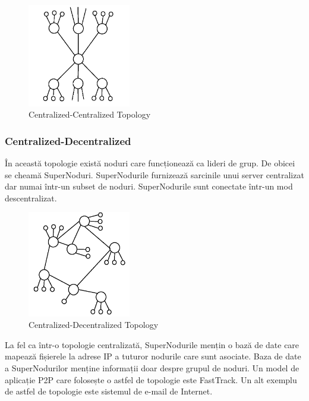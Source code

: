 \begin{figure}
  \centering
  \includegraphics[width=0.4\textwidth]{src/img/p2p-systems/centralized-centralized}
  \caption{Centralized-Centralized Topology}
  \label{fig:p2p-systems:centralized-centralized}
\end{figure}

\subsubsection{Centralized-Decentralized}

În această topologie există noduri care funcționează ca lideri de grup. De
obicei se cheamă SuperNoduri. SuperNodurile furnizează sarcinile unui server
centralizat dar numai într-un subset de noduri. SuperNodurile sunt conectate
într-un mod descentralizat.

\begin{figure}
  \centering
  \includegraphics[width=0.4\textwidth]{src/img/p2p-systems/centralized-decentralized}
  \caption{Centralized-Decentralized Topology}
  \label{fig:p2p-systems:centralized-decentralized}
\end{figure}

La fel ca într-o topologie centralizată, SuperNodurile mențin o bază de date
care mapează fișierele la adrese IP a tuturor nodurile care sunt asociate.
Baza de date a SuperNodurilor menține informații doar despre grupul de noduri.
Un model de aplicație P2P care folosește o astfel de topologie este FastTrack.
Un alt exemplu de astfel de topologie este sistemul de e-mail de Internet.

